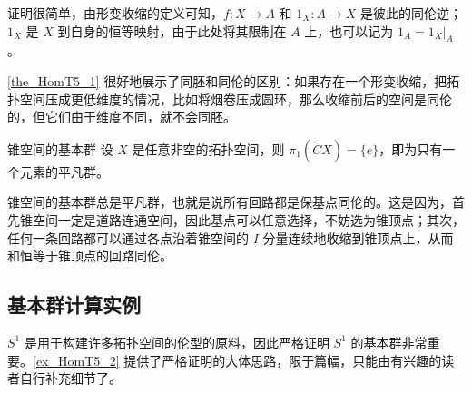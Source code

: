 证明很简单，由形变收缩的定义可知，$f:X\rightarrow A$ 和 $1_X:A\rightarrow X$ 是彼此的同伦逆；$1_X$ 是 $X$ 到自身的恒等映射，由于此处将其限制在 $A$ 上，也可以记为 $1_A=1_X|_A$。

\autoref{the_HomT5_1} 很好地展示了同胚和同伦的区别：如果存在一个形变收缩，把拓扑空间压成更低维度的情况，比如将烟卷压成圆环，那么收缩前后的空间是同伦的，但它们由于维度不同，就不会同胚。

\begin{theorem}{锥空间的基本群}
设 $X$ 是任意非空的拓扑空间，则 $\pi_1(\widetilde{C}X)=\{e\}$，即为只有一个元素的平凡群。
\end{theorem}

锥空间的基本群总是平凡群，也就是说所有回路都是保基点同伦的。这是因为，首先锥空间一定是道路连通空间，因此基点可以任意选择，不妨选为锥顶点；其次，任何一条回路都可以通过各点沿着锥空间的 $I$ 分量连续地收缩到锥顶点上，从而和恒等于锥顶点的回路同伦。



\subsection{基本群计算实例}


$S^1$ 是用于构建许多拓扑空间的伦型的原料，因此严格证明 $S^1$ 的基本群非常重要。\autoref{ex_HomT5_2} 提供了严格证明的大体思路，限于篇幅，只能由有兴趣的读者自行补充细节了。

